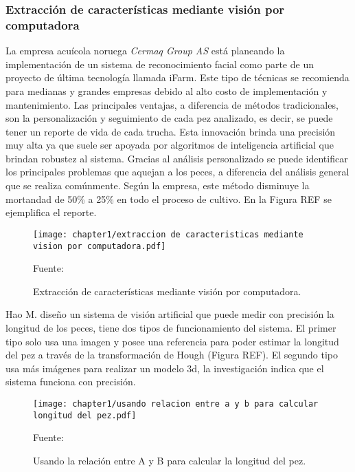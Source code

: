 \subsubsection{Extracción de características mediante visión por computadora}

La empresa acuícola noruega \textit{Cermaq Group AS} está planeando la implementación de un sistema de reconocimiento facial como parte de un proyecto de última tecnología llamada iFarm.\cite{Daley2018} Este tipo de técnicas se recomienda para medianas y grandes empresas debido al alto costo de implementación y mantenimiento. Las principales ventajas, a diferencia de métodos tradicionales, son la personalización y seguimiento de cada pez analizado, es decir, se puede tener un reporte de vida de cada trucha. Esta innovación brinda una precisión muy alta ya que suele ser apoyada por algoritmos de inteligencia artificial que brindan robustez al sistema. Gracias al análisis personalizado se puede identificar los principales problemas que aquejan a los peces, a diferencia del análisis general que se realiza comúnmente. Según la empresa, este método disminuye la mortandad de 50\% a 25\% en todo el proceso de cultivo. En la Figura REF se ejemplifica el reporte.

\begin{figure}[H]
	\centering
	\texttt{[image: chapter1/extraccion de caracteristicas mediante vision por computadora.pdf]}
	\caption{Extracción de características mediante visión por computadora.}
	Fuente: \cite{Biosort2016}
	\label{fig:extraccion de caracteristicas mediante vision por computadora}
\end{figure}

Hao M. diseño un sistema de visión artificial que puede medir con precisión la longitud de los peces, tiene dos tipos de funcionamiento del sistema. El primer tipo solo usa una imagen y posee una referencia para poder estimar la longitud del pez a través de la transformación de Hough (Figura REF). El segundo tipo usa más imágenes para realizar un modelo 3d, la investigación indica que el sistema funciona con precisión. \cite[p.~4-5]{Niu2018}

\begin{figure}[H]
	\centering
	\texttt{[image: chapter1/usando relacion entre a y b para calcular longitud del pez.pdf]}
	\caption{Usando la relación  entre A y B para calcular la longitud del pez.}
	Fuente: \cite{Hao2016}
	\label{fig:usando relacion entre a y b para calcular longitud del pez}
\end{figure}

